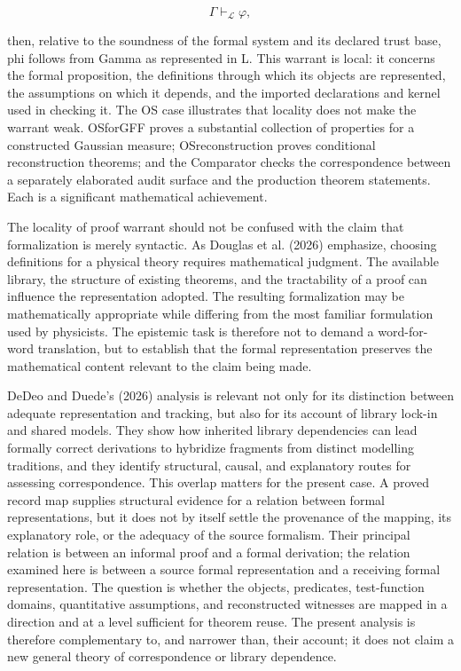 \documentclass[pdflatex,sn-apa]{sn-jnl}
\begin{document}
\[
\Gamma\vdash_{\mathcal L}\varphi,
\]

then, relative to the soundness of the formal system and its declared trust base, phi follows from Gamma as represented in L. This warrant is local: it concerns the formal proposition, the definitions through which its objects are represented, the assumptions on which it depends, and the imported declarations and kernel used in checking it. The OS case illustrates that locality does not make the warrant weak. OSforGFF proves a substantial collection of properties for a constructed Gaussian measure; OSreconstruction proves conditional reconstruction theorems; and the Comparator checks the correspondence between a separately elaborated audit surface and the production theorem statements. Each is a significant mathematical achievement.

The locality of proof warrant should not be confused with the claim that formalization is merely syntactic. As Douglas et al. (2026) emphasize, choosing definitions for a physical theory requires mathematical judgment. The available library, the structure of existing theorems, and the tractability of a proof can influence the representation adopted. The resulting formalization may be mathematically appropriate while differing from the most familiar formulation used by physicists. The epistemic task is therefore not to demand a word-for-word translation, but to establish that the formal representation preserves the mathematical content relevant to the claim being made.

DeDeo and Duede's (2026) analysis is relevant not only for its distinction between adequate representation and tracking, but also for its account of library lock-in and shared models. They show how inherited library dependencies can lead formally correct derivations to hybridize fragments from distinct modelling traditions, and they identify structural, causal, and explanatory routes for assessing correspondence. This overlap matters for the present case. A proved record map supplies structural evidence for a relation between formal representations, but it does not by itself settle the provenance of the mapping, its explanatory role, or the adequacy of the source formalism. Their principal relation is between an informal proof and a formal derivation; the relation examined here is between a source formal representation and a receiving formal representation. The question is whether the objects, predicates, test-function domains, quantitative assumptions, and reconstructed witnesses are mapped in a direction and at a level sufficient for theorem reuse. The present analysis is therefore complementary to, and narrower than, their account; it does not claim a new general theory of correspondence or library dependence.
\end{document}
